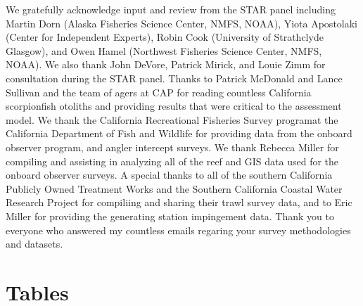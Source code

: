 \documentclass[12pt,]{article}
\begin{document}
We gratefully acknowledge input and review from the STAR panel including
Martin Dorn (Alaska Fisheries Science Center, NMFS, NOAA), Yiota
Apostolaki (Center for Independent Experts), Robin Cook (University of
Strathclyde Glasgow), and Owen Hamel (Northwest Fisheries Science
Center, NMFS, NOAA). We also thank John DeVore, Patrick Mirick, and
Louie Zimm for consultation during the STAR panel. Thanks to Patrick
McDonald and Lance Sullivan and the team of agers at CAP for reading
countless California scorpionfish otoliths and providing results that
were critical to the assessment model. We thank the California
Recreational Fisheries Survey programat the California Department of
Fish and Wildlife for providing data from the onboard observer program,
and angler intercept surveys. We thank Rebecca Miller for compiling and
assisting in analyzing all of the reef and GIS data used for the onboard
observer surveys. A special thanks to all of the southern California
Publicly Owned Treatment Works and the Southern California Coastal Water
Research Project for compiliing and sharing their trawl survey data, and
to Eric Miller for providing the generating station impingement data.
Thank you to everyone who answered my countless emails regaring your
survey methodologies and datasets.

\newpage

\FloatBarrier

\section{Tables}\label{tables}

\FloatBarrier
\end{document}
